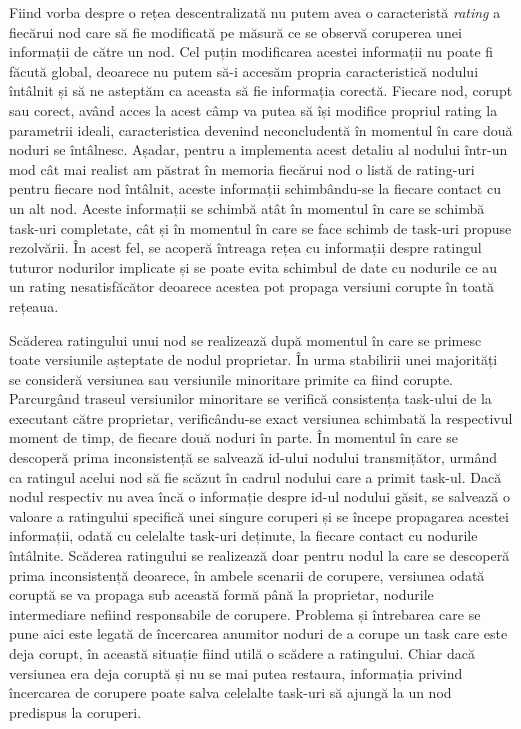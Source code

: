 \documentclass[12pt,a4paper]{report}
\begin{document}
Fiind vorba despre o rețea descentralizată nu putem avea o caracteristă \textit{rating} a fiecărui nod care să fie modificată pe măsură ce se observă coruperea unei informații de către un nod. Cel puțin modificarea acestei informații nu poate fi făcută global, deoarece nu putem să-i accesăm propria caracteristică nodului întâlnit și să ne asteptăm ca aceasta să fie informația corectă. Fiecare nod, corupt sau corect, având acces la acest câmp va putea să își modifice propriul rating la parametrii ideali, caracteristica devenind neconcludentă în momentul în care două noduri se întâlnesc. Așadar, pentru a implementa acest detaliu al nodului într-un mod cât mai realist am păstrat în memoria fiecărui nod o listă de rating-uri pentru fiecare nod întâlnit, aceste informații schimbându-se la fiecare contact cu un alt nod. Aceste informații se schimbă atât în momentul în care se schimbă task-uri completate, cât și în momentul în care se face schimb de task-uri propuse rezolvării. În acest fel, se acoperă întreaga rețea cu informații despre ratingul tuturor nodurilor implicate și se poate evita schimbul de date cu nodurile ce au un rating nesatisfăcător deoarece acestea pot propaga versiuni corupte în toată rețeaua.

Scăderea ratingului unui nod se realizează după momentul în care se primesc toate versiunile așteptate de nodul proprietar. În urma stabilirii unei majorități se consideră versiunea sau versiunile minoritare primite ca fiind corupte. Parcurgând traseul versiunilor minoritare se verifică consistența task-ului de la executant către proprietar, verificându-se exact versiunea schimbată la respectivul moment de timp, de fiecare două noduri în parte. În momentul în care se descoperă prima inconsistență se salvează id-ului nodului transmițător, urmând ca ratingul acelui nod să fie scăzut în cadrul nodului care a primit task-ul. Dacă nodul respectiv nu avea încă o informație despre id-ul nodului găsit, se salvează o valoare a ratingului specifică unei singure coruperi și se începe propagarea acestei informații, odată cu celelalte task-uri deținute, la fiecare contact cu nodurile întâlnite. Scăderea ratingului se realizează doar pentru nodul la care se descoperă prima inconsistență deoarece, în ambele scenarii de corupere, versiunea odată coruptă se va propaga sub această formă până la proprietar, nodurile intermediare nefiind responsabile de corupere. Problema și întrebarea care se pune aici este legată de încercarea anumitor noduri de a corupe un task care este deja corupt, în această situație fiind utilă o scădere a ratingului. Chiar dacă versiunea era deja coruptă și nu se mai putea restaura, informația privind încercarea de corupere poate salva celelalte task-uri să ajungă la un nod predispus la coruperi.   
\end{document}
